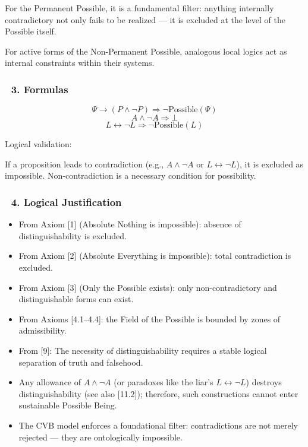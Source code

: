\documentclass[12pt]{article}
\begin{document}
For the Permanent Possible, it is a fundamental filter: anything internally contradictory not only fails to be realized — it is excluded at the level of the Possible itself.

For active forms of the Non-Permanent Possible, analogous local logics act as internal constraints within their systems.

\subsubsection*{🔹 3. Formulas}

\[
\Psi \to (P \land \neg P) \Rightarrow \neg\mathrm{Possible}(\Psi)
\]
\[
A \land \neg A \Rightarrow \bot
\]
\[
L \leftrightarrow \neg L \Rightarrow \neg\mathrm{Possible}(L)
\]

Logical validation:

If a proposition leads to contradiction (e.g., $A \land \neg A$ or $L \leftrightarrow \neg L$), it is excluded as impossible. Non-contradiction is a necessary condition for possibility.

\subsubsection*{🔹 4. Logical Justification}

\begin{itemize}
\item From Axiom [1] (Absolute Nothing is impossible): absence of distinguishability is excluded.
\item From Axiom [2] (Absolute Everything is impossible): total contradiction is excluded.
\item From Axiom [3] (Only the Possible exists): only non-contradictory and distinguishable forms can exist.
\item From Axioms [4.1–4.4]: the Field of the Possible is bounded by zones of admissibility.
\item From [9]: The necessity of distinguishability requires a stable logical separation of truth and falsehood.
\item Any allowance of $A \land \neg A$ (or paradoxes like the liar's $L \leftrightarrow \neg L$) destroys distinguishability (see also [11.2]); therefore, such constructions cannot enter sustainable Possible Being.
\item The CVB model enforces a foundational filter: contradictions are not merely rejected — they are ontologically impossible.
\end{itemize}
\end{document}
